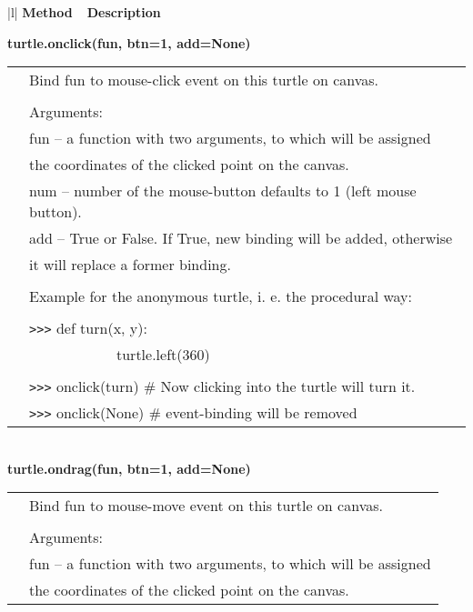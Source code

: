 \begin{center}
{\small
\begin{tabular}{|l|} \hline
{\bf Method~~Description}  \\ \hline\hline 


{\bf    turtle.onclick(fun, btn=1, add=None)} \\
   \begin{tabular}{p{0.25in}p{4in}}
&        Bind fun to mouse-click event on this turtle on canvas. \\
&  \\
&        Arguments: \\
&        fun --  a function with two arguments, to which will be assigned \\
&                the coordinates of the clicked point on the canvas. \\
&        num --  number of the mouse-button defaults to 1 (left mouse button). \\
&        add --  True or False. If True, new binding will be added, otherwise \\
&                it will replace a former binding. \\
&  \\
&        Example for the anonymous turtle, i. e. the procedural way: \\
&  \\
&        \verb+>+\verb+>+\verb+>+ def turn(x, y): \\
&                ~~~~~~~~~~~~turtle.left(360) \\
&  \\
&        \verb+>+\verb+>+\verb+>+ onclick(turn) \# Now clicking into the turtle will turn it. \\
&        \verb+>+\verb+>+\verb+>+ onclick(None)  \# event-binding will be removed \\
\end{tabular} \\ \hline
{\bf    turtle.ondrag(fun, btn=1, add=None)} \\
   \begin{tabular}{p{0.25in}p{4in}}
&        Bind fun to mouse-move event on this turtle on canvas. \\
&  \\
&        Arguments: \\
&        fun -- a function with two arguments, to which will be assigned \\
&               the coordinates of the clicked point on the canvas. \\

\end{tabular}
\end{tabular}}
\end{center}
